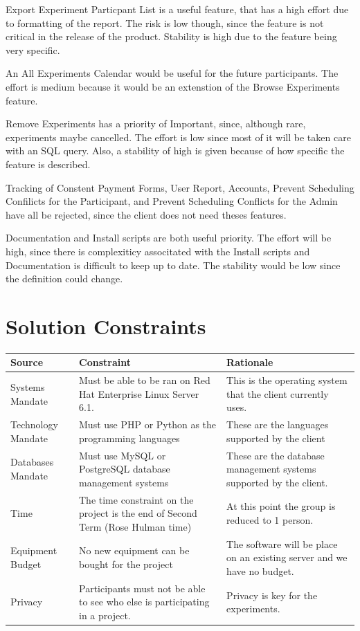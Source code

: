 Export Experiment Particpant List is a useful feature, that has a high effort due to formatting of the report.  The risk is low though, since the feature is not critical in the release of the product.  Stability is high due to the feature being very specific.

An All Experiments Calendar would be useful for the future participants.  The effort is medium because it would be an extenstion of the Browse Experiments feature.

Remove Experiments has a priority of Important, since, although rare, experiments maybe cancelled. The effort is low since most of it will be taken care with an SQL query.  Also, a stability of high is given because of  how specific the feature is described.

Tracking of Constent Payment Forms, User Report, Accounts, Prevent Scheduling Confilicts for the Participant, and Prevent Scheduling Conflicts for the Admin have all be rejected, since the client does not need theses features.

Documentation and Install scripts are both useful priority.  The effort will be high, since there is complexiticy associtated with the Install scripts and Documentation is difficult to keep up to date.  The stability would be low since the definition could change.

\section{Solution Constraints}
\begin{table}[!h]
    \begin{tabular}{|l|p{5.5cm}|p{5.5cm}|}
        \hline
        Source & Constraint & Rationale \\
        \hline
        Systems Mandate & Must be able to be ran on Red Hat Enterprise Linux Server 6.1. & This is the operating system that the client currently uses. \\
        \hline
        Technology Mandate & Must use PHP or Python as the programming languages & These are the languages supported by the client \\
        \hline
        Databases Mandate & Must use MySQL or PostgreSQL database management systems & These are the database management systems supported by the client. \\
        \hline
        Time  & The time constraint on the project is the end of Second Term (Rose Hulman time) & At this point the group is reduced to 1 person. \\
        \hline
        Equipment Budget & No new equipment can be bought for the project & The software will be place on an existing server and we have no budget. \\
        \hline
        Privacy & Participants must not be able to see who else is participating in a project. & Privacy is key for the experiments. \\
        \hline
    \end{tabular}
\end{table}

